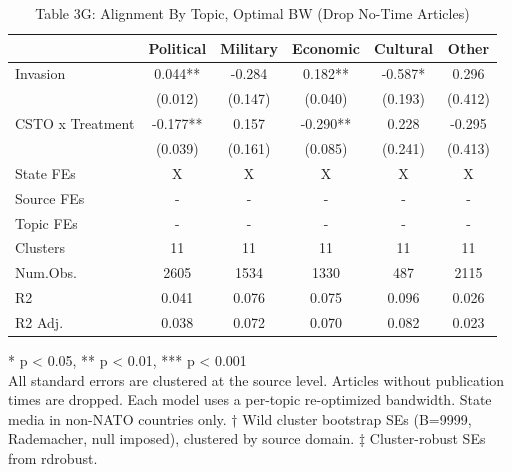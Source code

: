 \begin{table}[!t]
\caption{Table 3G: Alignment By Topic, Optimal BW (Drop No-Time Articles)} 
\fontsize{12.0pt}{14.4pt}\selectfont
\begin{tabular*}{\linewidth}{@{\extracolsep{\fill}}lccccc}
\toprule
  & Political & Military & Economic & Cultural & Other \\ 
\midrule\addlinespace[2.5pt]
Invasion & 0.044** & -0.284 & 0.182** & -0.587* & 0.296 \\ 
 & (0.012) & (0.147) & (0.040) & (0.193) & (0.412) \\ 
CSTO x Treatment & -0.177** & 0.157 & -0.290** & 0.228 & -0.295 \\ 
{} & {(0.039)} & {(0.161)} & {(0.085)} & {(0.241)} & {(0.413)} \\ 
State FEs & X & X & X & X & X \\ 
Source FEs & - & - & - & - & - \\ 
Topic FEs & - & - & - & - & - \\ 
Clusters & 11 & 11 & 11 & 11 & 11 \\ 
Num.Obs. & 2605 & 1534 & 1330 & 487 & 2115 \\ 
R2 & 0.041 & 0.076 & 0.075 & 0.096 & 0.026 \\ 
R2 Adj. & 0.038 & 0.072 & 0.070 & 0.082 & 0.023 \\ 
\bottomrule
\end{tabular*}
\begin{minipage}{\linewidth}
* p < 0.05, ** p < 0.01, *** p < 0.001\\
All standard errors are clustered at the source level. Articles without
publication times are dropped. Each model uses a per-topic re-optimized
bandwidth. State media in non-NATO countries only. † Wild cluster bootstrap SEs
(B=9999, Rademacher, null imposed), clustered by source domain. ‡ Cluster-robust
SEs from rdrobust.\\
\end{minipage}
\end{table}

